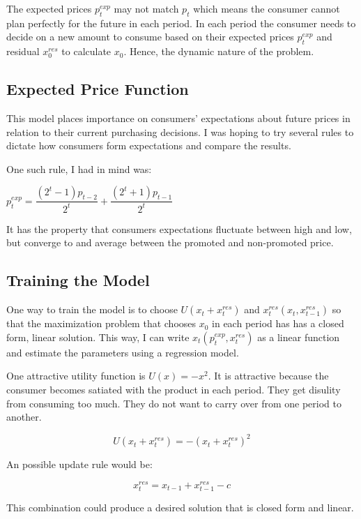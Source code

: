 \documentclass{article}
\begin{document}
The expected prices $p^{exp}_t$ may not match $p_t$ which means the consumer cannot plan perfectly for the future in each period. In each period the consumer needs to decide on a new amount to consume based on their expected prices $p_t^{exp}$  and residual $x^{res}_0$ to calculate $x_0$. Hence, the dynamic nature of the problem.

\subsection{Expected Price Function}

This model places importance on consumers' expectations about future prices in relation to their current purchasing decisions. I was hoping to try several rules to dictate how consumers form expectations and compare the results.

One such rule, I had in mind was:

$p^{exp}_t = \dfrac {(2^t-1)p_{t-2}} {2^t} + \dfrac {(2^t+1)p_{t-1}} {2^t}$ 

It has the property that consumers expectations fluctuate between high and low, but converge to and average between the promoted and non-promoted price.


\subsection{Training the Model}

One way to train the model is to choose $U(x_t + x^{res}_t)$ and $x^{res}_t(x_t,x^{res}_{t-1})$ so that the maximization problem that chooses $x_0$ in each period has has a closed form, linear solution. This way, I can write $x_t(p_t^{exp},x^{res}_t)$ as a linear function and estimate the parameters using a regression model.

One attractive utility function is $U(x) = -x^2$. It is attractive because the consumer becomes satiated with the product in each period. They get disulity from consuming too much. They do not want to carry over from one period to another.

$$U(x_t + x^{res}_t) = -(x_t + x^{res}_t)^2$$ 

An possible update rule would be:

$$x^{res}_t = x_{t-1} + x^{res}_{t-1} - c$$

This combination could produce a desired solution that is closed form and linear.

{}

\end{document}
